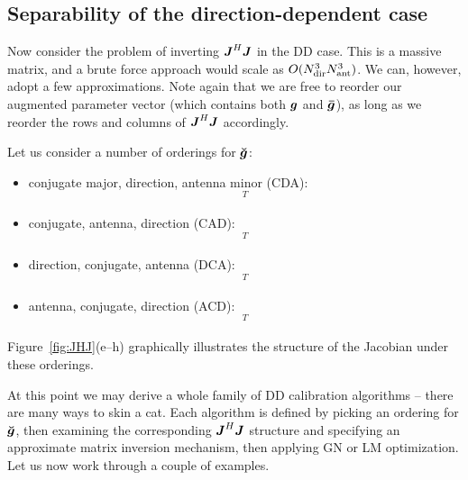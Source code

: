 \documentclass[useAMS,usenatbib]{mn2e}
\newcommand{\mat}[1]{{\bmath{#1}}}
\newcommand{\JJ}{\mat{J}} %
\newcommand{\JHJ}{\JJ^H\JJ} %
\newcommand{\AUG}[1]{\bmath{\breve{#1}}}
\newcommand{\Gg}{\AUG{g}}
\numberwithin{equation}{section}
\begin{document}
\subsection{Separability of the direction-dependent case}

Now consider the problem of inverting $\JHJ$ in the DD case. This is a massive matrix, and a brute force 
approach would scale as $O(N_\mathrm{dir}^3N_\mathrm{ant}^3)$. We can, however, adopt a few approximations. Note again that we are 
free to reorder our augmented parameter vector (which contains both $\bmath{g}$ and $\bmath{\bar g}$), 
as long as we reorder the rows and columns of $\JHJ$ accordingly.

Let us consider a number of orderings for $\Gg$:

\begin{itemize}
\item conjugate major, direction, antenna minor (CDA):
\begin{equation}
[g^{(1)}_1 \dots g^{(1)}_{\Na}, g^{(2)}_1 \dots g^{(2)}_{\Na}, g^{(3)}_1 \dots g^{(\Nd)}_{\Na}, 
 \bar{g}^{(1)}_1 \dots \bar{g}^{(1)}_{\Na} \dots ]^T
\end{equation}
\item conjugate, antenna, direction (CAD):
\begin{equation}
[g^{(1)}_1 \dots g^{(\Nd)}_1, g^{(1)}_2 \dots g^{(\Nd)}_2, g^{(1)}_3 \dots g^{(\Nd)}_{\Na}, 
 \bar{g}^{(1)}_1 \dots ]^T
\end{equation}
\item direction, conjugate, antenna (DCA):
\begin{equation}
[g^{(1)}_1 \dots g^{(1)}_{\Na},\bar{g}^{(1)}_1 \dots \bar{g}^{(1)}_{\Na},
g^{(2)}_1 \dots g^{(2)}_{\Na}, \bar{g}^{(2)}_1 \dots ]^T
\end{equation}
\item antenna, conjugate, direction (ACD):
\begin{equation}
[g^{(1)}_1 \dots g^{(\Nd)}_1,\bar{g}^{(1)}_1 \dots \bar{g}^{(\Nd)}_1,
g^{(1)}_2 \dots g^{(\Nd)}_2, \bar{g}^{(1)}_2 \dots ]^T
\end{equation}
\end{itemize}

Figure~\ref{fig:JHJ}(e--h) graphically illustrates the structure of the Jacobian under these orderings.

At this point we may derive a whole family of DD calibration algorithms -- there are many ways to skin a cat. Each 
algorithm is defined by picking an ordering for $\Gg$, then examining the corresponding $\JHJ$ structure 
and specifying an approximate matrix inversion mechanism, then applying GN or LM optimization. Let us now work 
through a couple of examples.
\end{document}

